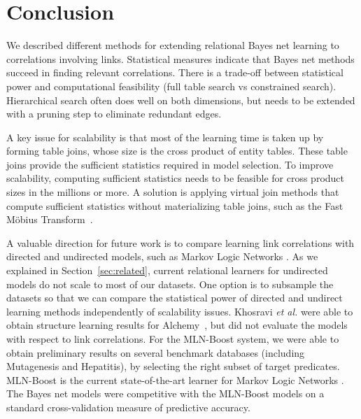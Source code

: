 \documentclass[runningheads,a4paper]{llncs}
\begin{document}
\section{Conclusion} We described different methods for extending relational Bayes net learning to correlations involving links. 
Statistical measures indicate that Bayes net methods succeed in finding relevant correlations. 
There is a trade-off between statistical power and computational feasibility (full table search vs constrained search). 
Hierarchical search often does well on both dimensions, but needs to be extended with a pruning step to eliminate redundant edges.

A key issue for scalability is that most of the learning time is taken up by forming table joins, whose size is the cross product of entity tables. 
These table joins provide the sufficient statistics required in model selection. 
To improve scalability, computing sufficient statistics needs to be feasible for cross product sizes in the millions or more. 
A  solution is applying virtual join methods that compute sufficient statistics without materializing table joins, such as the Fast M\"obius Transform~\cite{Schulte2012b,Yin2004}.

A valuable direction for future work is to compare learning link correlations with directed and undirected models, such as Markov Logic Networks \cite{Domingos2009}. As we explained in Section~\ref{sec:related}, current relational learners for undirected models do not scale to most of our datasets. One option is to subsample the datasets so that we can compare the statistical power of directed and undirect learning methods
independently of scalability issues. Khosravi {\em et al.} were able to obtain structure learning results for Alchemy~\cite{Khosravi2010}, but did not evaluate the models with respect to link correlations. For the MLN-Boost system, we were able to obtain preliminary results on several benchmark databases  (including Mutagenesis and Hepatitis), by selecting the right subset of target predicates. MLN-Boost is the current state-of-the-art learner for Markov Logic Networks \cite{Khot2011}. The Bayes net models were competitive with the MLN-Boost models on a standard cross-validation measure of predictive accuracy.



\end{document}
